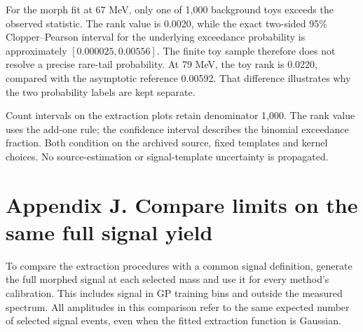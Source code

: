 \documentclass[11pt]{article}
\begin{document}
For the morph fit at 67 MeV, only one of 1,000 background toys exceeds the observed statistic. The rank value is 0.0020, while the exact two-sided 95\% Clopper--Pearson interval for the underlying exceedance probability is approximately $[0.000025,0.00556]$. The finite toy sample therefore does not resolve a precise rare-tail probability. At 79 MeV, the toy rank is 0.0220, compared with the asymptotic reference 0.00592. That difference illustrates why the two probability labels are kept separate.

Count intervals on the extraction plots retain denominator 1,000. The rank value uses the add-one rule; the confidence interval describes the binomial exceedance fraction. Both condition on the archived source, fixed templates and kernel choices. No source-estimation or signal-template uncertainty is propagated.
\clearpage\section*{Appendix J. Compare limits on the same full signal yield}

To compare the extraction procedures with a common signal definition, generate the full morphed signal at each selected mass and use it for every method's calibration. This includes signal in GP training bins and outside the measured spectrum. All amplitudes in this comparison refer to the same expected number of selected signal events, even when the fitted extraction function is Gaussian.
\end{document}
